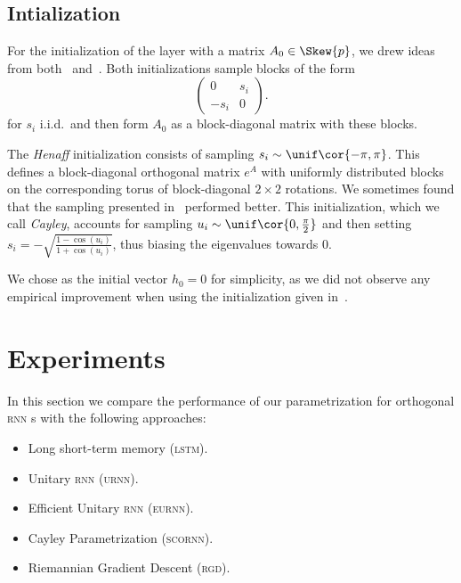 \subsection{Intialization}
For the initialization of the layer with a matrix $A_0 \in \Skew{p}$, we drew ideas from both~\cite{henaff2016recurrent} and~\cite{helfrich18a}. Both initializations sample blocks of the form
\[

\begin{pmatrix}
    0 & s_i \\
    -s_i & 0
\end{pmatrix}

.
\]
for $s_i$ i.i.d.\ and then form $A_0$ as a block-diagonal matrix with these blocks.

The \emph{Henaff} initialization consists of sampling $s_i \sim \unif\cor{-\pi, \pi}$. This defines a block-diagonal orthogonal matrix $e^A$ with uniformly distributed blocks on the corresponding torus of block-diagonal $2 \times 2$ rotations. We sometimes found that the sampling presented in~\cite{helfrich18a} performed better. This initialization, which we call \emph{Cayley}, accounts for sampling $u_i \sim \unif\cor{0, \frac{\pi}{2}}$ and then setting $s_i = -\sqrt{\frac{1 - \cos(u_i)}{1+\cos(u_i)}}$, thus biasing the eigenvalues towards $0$.

We chose as the initial vector $h_0 = 0$ for simplicity, as we did not observe any empirical improvement when using the initialization given in~\cite{arjovsky2016unitary}.

\section{Experiments}\label{sec:experiments}
In this section we compare the performance of our parametrization for orthogonal \textsc{rnn} s with the following approaches:
\ifdefined\isarxiv

\begin{itemize}[itemsep=0mm]
        \item Long short-term memory (\textsc{lstm}). \\ \cite{hochreiter1997long}
        \item Unitary \textsc{rnn} (\textsc{urnn}). \\ \cite{arjovsky2016unitary}
        \item Efficient Unitary \textsc{rnn} (\textsc{eurnn}). \\ \cite{jing2017tunable}
        \item Cayley Parametrization (\textsc{scornn}). \\ \cite{helfrich18a}
        \item Riemannian Gradient Descent (\textsc{rgd}). \\ \cite{wisdom2016full}
    \end{itemize}

